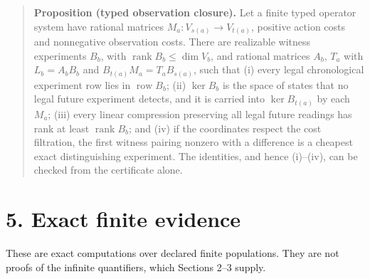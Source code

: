 \documentclass[
  11pt,
  a4paper,
]{report}
\begin{document}
\begin{quote}
\textbf{Proposition (typed observation closure).} Let a finite typed
operator system have rational matrices \(M_a:V_{s(a)}\to V_{t(a)}\),
positive action costs and nonnegative observation costs. There are
realizable witness experiments \(B_b\), with
\(\operatorname{rank}B_b\le\dim V_b\), and rational matrices \(A_b\),
\(T_a\) with \(L_b=A_bB_b\) and \(B_{t(a)}M_a=T_aB_{s(a)}\), such that
(i) every legal chronological experiment row lies in
\(\operatorname{row}B_b\); (ii) \(\ker B_b\) is the space of states that
no legal future experiment detects, and it is carried into
\(\ker B_{t(a)}\) by each \(M_a\); (iii) every linear compression
preserving all legal future readings has rank at least
\(\operatorname{rank}B_b\); and (iv) if the coordinates respect the cost
filtration, the first witness pairing nonzero with a difference is a
cheapest exact distinguishing experiment. The identities, and hence
(i)--(iv), can be checked from the certificate alone.
\end{quote}

\hypertarget{exact-finite-evidence}{%
\section{5. Exact finite evidence}\label{exact-finite-evidence}}

These are exact computations over declared finite populations. They are
not proofs of the infinite quantifiers, which Sections 2--3 supply.
\end{document}
